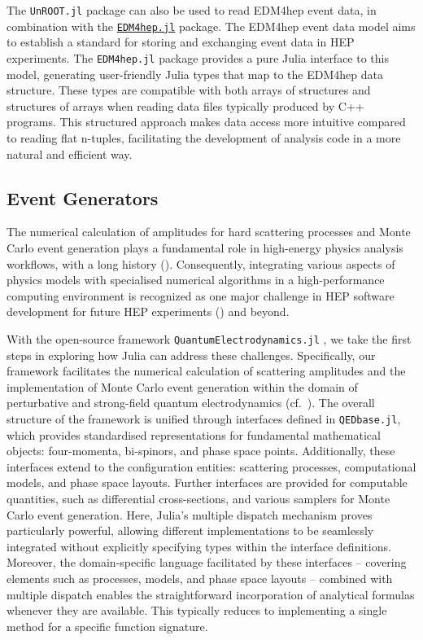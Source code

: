 \documentclass{webofc}
\begin{document}
The \texttt{UnROOT.jl} package can also be used to read EDM4hep
\cite{EDM4hep:2022leb} event data, in combination with the
\href{https://github.com/JuliaHEP/EDM4hep.jl}{\texttt{EDM4hep.jl}} package. The
EDM4hep event data model aims to establish a standard for storing and exchanging
event data in HEP experiments. The \texttt{EDM4hep.jl} package provides a pure
Julia interface to this model, generating user-friendly Julia types that map to
the EDM4hep data structure. These types are compatible with both arrays of
structures and structures of arrays when reading data files typically produced
by C++ programs. This structured approach makes data access more intuitive
compared to reading flat n-tuples, facilitating the development of analysis code
in a more natural and efficient way.

\subsection{Event Generators}

The numerical calculation of amplitudes for hard scattering processes and Monte
Carlo event generation plays a fundamental role in high-energy physics analysis
workflows, with a long history (\cite{campbell2024event}). Consequently,
integrating various aspects of physics models with specialised numerical
algorithms in a high-performance computing environment is recognized as one
major challenge in HEP software development for future HEP experiments
(\cite{HEPSoftwareFoundation:2017ggl, HSFPhysicsEventGeneratorWG:2020gxw,
HSFPhysicsEventGeneratorWG:2021xti}) and beyond.

With the open-source framework \texttt{QuantumElectrodynamics.jl}
\cite{qedjl-github}, we take the first steps in exploring how Julia
can address these challenges. Specifically, our framework
facilitates the numerical calculation of scattering amplitudes and the
implementation of Monte Carlo event generation within the domain of perturbative
and strong-field quantum electrodynamics (cf.~\cite{Fedotov:2022ely}). The
overall structure of the framework is unified through interfaces defined in
\texttt{QEDbase.jl}, which provides standardised representations for fundamental
mathematical objects: four-momenta, bi-spinors, and phase space points.
Additionally, these interfaces extend to the configuration entities: 
scattering processes, computational models, and phase space layouts. Further
interfaces are provided for computable quantities, such as differential
cross-sections, and various samplers for Monte Carlo event generation. Here,
Julia’s multiple dispatch mechanism proves particularly powerful, allowing
different implementations to be seamlessly integrated without explicitly
specifying types within the interface definitions. Moreover, the domain-specific
language facilitated by these interfaces -- covering elements such as processes,
models, and phase space layouts -- combined with multiple dispatch enables the
straightforward incorporation of analytical formulas whenever they are
available. This typically reduces to implementing a single method for a specific
function signature.
\end{document}
